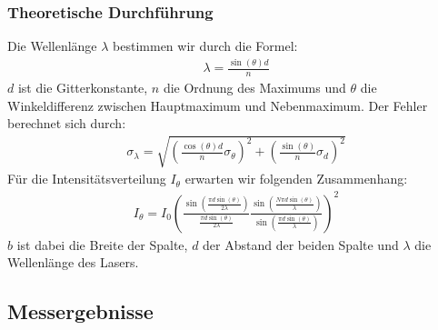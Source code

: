 \documentclass[12pt]{scrartcl}
\begin{document}
\subsubsection{Theoretische Durchführung}
Die Wellenlänge $\lambda$ bestimmen wir durch die Formel:
\begin{align}
\lambda = \frac{\sin(\theta) d}{n}
\end{align}
$d$ ist die Gitterkonstante, $n$ die Ordnung des Maximums und $\theta$ die Winkeldifferenz zwischen Hauptmaximum und Nebenmaximum.
Der Fehler berechnet sich durch:
\begin{align}
\sigma_\lambda = \sqrt{
\left(\frac{\cos(\theta) d}{n}\sigma_\theta\right)^2+
\left(\frac{\sin(\theta)}{n}\sigma_d\right)^2}
\end{align}
Für die Intensitätsverteilung $I_\theta$ erwarten wir folgenden Zusammenhang:
\begin{align}
I_\theta = I_0\left(\frac{\sin\left(\frac{\pi d \sin(\theta)}{2\lambda}\right)}{\frac{\pi d \sin(\theta)}{2\lambda}}
\frac{\sin\left(\frac{N \pi d \sin(\theta)}{\lambda}\right)}{\sin\left(\frac{\pi d \sin(\theta)}{\lambda}\right)}\right)^2
\end{align}
$b$ ist dabei die Breite der Spalte, $d$ der Abstand der beiden Spalte und $\lambda$ die Wellenlänge des Lasers.

\subsection{Messergebnisse}
\end{document}
